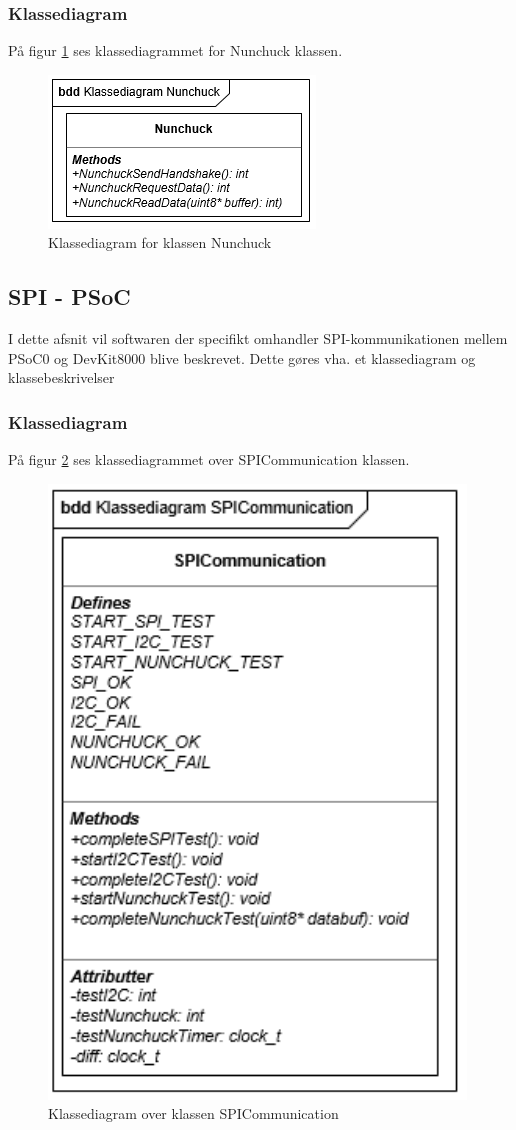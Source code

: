 \subsubsection{Klassediagram}
På figur \ref{figure:NunchuckKlassediagram} ses klassediagrammet for Nunchuck klassen.

\begin{figure}[H]
	\centering
	\includegraphics[]{DesignOgImplementering/images/nunchuck}
	\caption{Klassediagram for klassen Nunchuck}
	\label{figure:NunchuckKlassediagram}
\end{figure}

\subsection{SPI - PSoC}
I dette afsnit vil softwaren der specifikt omhandler SPI-kommunikationen mellem PSoC0 og DevKit8000 blive beskrevet. Dette gøres vha. et klassediagram og klassebeskrivelser

\subsubsection{Klassediagram}
På figur \ref{figure:KlassediagramSPICommunication} ses klassediagrammet over SPICommunication klassen.

\begin{figure}[H]
	\centering
	\includegraphics[]{DesignOgImplementering/images/SPICommunication}
	\caption{Klassediagram over klassen SPICommunication}
	\label{figure:KlassediagramSPICommunication}
\end{figure}